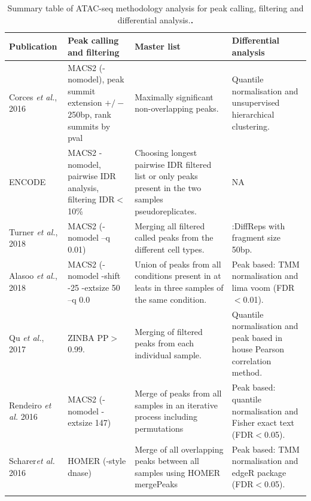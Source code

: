 %
\begin{landscape}
\begin{center}
\begin{longtable}[ht]{p{.15\textheight} p{.40\textheight} p{.40\textheight} p{.40\textheight}}
\caption{Summary table of ATAC-seq methodology analysis for peak calling, filtering and differential analysis.\textbf{.}}
\label{tab:ATAC_comparative_methods} \\
\toprule
\textbf{Publication} & \textbf{Peak calling and filtering} & \textbf{Master list} & \textbf{Differential analysis} \\
\midrule
\midrule
Corces \textit{et al.}, 2016 & MACS2 (-nomodel), peak summit extension $+/-$250bp, rank summits by pval & Maximally significant non-overlapping peaks. & Quantile normalisation and unsupervised hierarchical clustering. \\

\midrule
ENCODE  & MACS2 -nomodel, pairwise IDR analysis, filtering IDR$<$10\% & Choosing longest pairwise IDR filtered list or only peaks present in the two samples pseudoreplicates. & NA \\
              
\midrule
Turner \textit{et al.}, 2018 	& MACS2 (-nomodel --q 0.01) & Merging all filtered called peaks from the different cell types. & \texti{De novo}:DiffReps with fragment size 50bp. \\                             
																																										
\midrule
Alasoo \textit{et al.}, 2018 & MACS2 (-nomodel -shift -25 -extsize 50 --q 0.0 &	Union of peaks from all conditions present in at leats in three samples of the same condition. & Peak based: TMM normalisation and lima voom (FDR$<$0.01).\\ 

\midrule
Qu \textit{et al.}, 2017 & ZINBA PP$>$0.99. & Merging of filtered peaks from each individual sample. & Quantile normalisation and peak based in house Pearson correlation method. \\							

\midrule
Rendeiro \textit{et al.} 2016 & MACS2 (-nomodel -extsize 147)	& Merge of peaks from all samples in an iterative process including permutations & Peak based: quantile normalisation and Fisher exact text (FDR$<$0.05). \\

\midrule
Scharer\textit{et al.} 2016 & HOMER (-style dnase) & Merge of all overlapping peaks between all samples using HOMER mergePeaks & Peak based: TMM normalisation and edgeR package (FDR$<$0.05). \\														   
\bottomrule
\medskip
\end{longtable}
\end{center}
\end{landscape}

